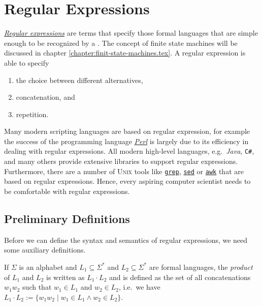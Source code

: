 \chapter{Regular Expressions \label{chapter:regular-expressions}}
\href{http://en.wikipedia.org/wiki/Regular_expression}{\emph{Regular expressions}} are terms that
specify those formal languages that are simple enough to be recognized by a .
The concept of finite state machines will be discussed in chapter \ref{chapter:finit-state-machines.tex}.
A regular expression is able to specify 
\begin{enumerate}
\item the choice between different alternatives,
\item concatenation, and
\item repetition.
\end{enumerate}
Many modern scripting languages are based on regular expression, for example
the success of the programming language \href{http://en.wikipedia.org/wiki/Perl}{\textsl{Perl}} is
largely due to its efficiency in dealing with regular expressions.
All modern high-level languages, e.g.~\textsl{Java}, \texttt{C\#}, and many others
provide extensive libraries to support regular expressions.  Furthermore, there are a number of 
\textsc{Unix} tools like \href{http://en.wikipedia.org/wiki/Grep}{\texttt{grep}}, 
\href{http://en.wikipedia.org/wiki/Sed}{\texttt{sed}} or
\href{http://en.wikipedia.org/wiki/Awk}{\texttt{awk}} that are based on regular expressions.  Hence,
every aspiring computer scientist needs to be comfortable with regular expressions.


\section{Preliminary Definitions}
Before we can define the syntax and semantics of regular expressions, we need some auxiliary definitions. 


\begin{Definition}
  If $\Sigma$ is an  alphabet and $L_1 \subseteq \Sigma^*$ and $L_2 \subseteq \Sigma^*$ are formal
  languages, the \emph{product} of $L_1$ and $L_2$ is written as
  $L_1 \cdot L_2$ and is defined as the set of all concatenations $w_1w_2$ such that $w_1 \in L_1$ and
  $w_2 \in L_2$, i.e.~we have
  \\[0.2cm]
  \hspace*{1.3cm}
  $L_1 \cdot L_2 := \bigl\{ w_1w_2 \mid w_1 \in L_1 \wedge w_2 \in L_2 \bigr\}$. \eox
\end{Definition}

